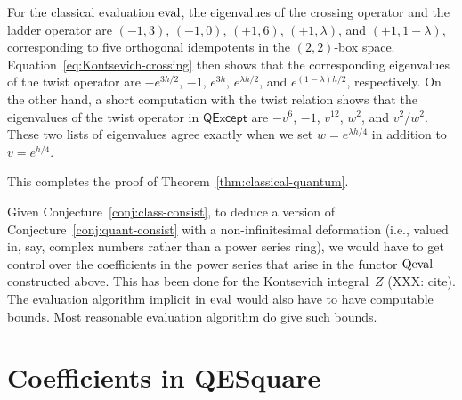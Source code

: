 \documentclass[12pt]{amsart}
\begin{document}
For the classical evaluation $\operatorname{eval}$, the eigenvalues of the crossing
operator and the ladder operator
are $(-1, 3)$, $(-1, 0)$, $(+1, 6)$, $(+1, \lambda)$, and
$(+1, 1-\lambda)$, corresponding to five orthogonal idempotents in the
$(2,2)$-box space. Equation~\eqref{eq:Kontsevich-crossing} then shows
that the corresponding eigenvalues of the twist operator are
$-e^{3h/2}$, $-1$, $e^{3h}$, $e^{\lambda h/2}$, and
$e^{(1-\lambda)h/2}$, respectively.
On the other hand, a short computation with
the twist relation shows that the eigenvalues of the twist
operator in $\mathsf{QExcept}$ are $-v^6$, $-1$, $v^{12}$, $w^2$, and
$v^2/w^2$. These two lists of eigenvalues agree exactly when we set
$w = e^{\lambda h/4}$ in addition to $v = e^{h/4}$.

This completes the proof of Theorem~\ref{thm:classical-quantum}.

\begin{remark}
  Given Conjecture~\ref{conj:class-consist}, to deduce a version of
  Conjecture~\ref{conj:quant-consist} with a non-infinitesimal
  deformation (i.e., valued in, say, complex numbers rather than a
  power series ring), we would have to get control over the
  coefficients in the power series that arise in the functor $\operatorname{Qeval}$
  constructed above. This has been done for the Kontsevich
  integral~$Z$ (XXX: cite). The evaluation algorithm implicit in
  $\operatorname{eval}$ would also have to have computable bounds.  Most
  reasonable evaluation algorithm do give such bounds.
\end{remark}


\appendix
\section{Coefficients in QESquare}
\label{app:coefficients}

\nn{}

\renewcommand*{\bibfont}{\small}
\setlength{\bibitemsep}{0pt}
\raggedright
\printbibliography
\end{document}
